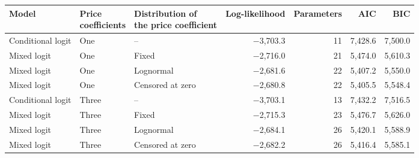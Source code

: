 \begin{tabular}{lllrrrr}
\toprule
Model & \makecell{Price\\coefficients} & \makecell{Distribution of\\the price coefficient} & Log-likelihood & Parameters & AIC & BIC
\\
\midrule
Conditional logit & One & -- & $-$3,703.3 & 11 & 7,428.6 & 7,500.0 \\
Mixed logit & One & Fixed & $-$2,716.0 & 21 & 5,474.0 & 5,610.3 \\
Mixed logit & One & Lognormal & $-$2,681.6 & 22 & 5,407.2 & 5,550.0 \\
Mixed logit & One & Censored at zero & $-$2,680.8 & 22 & 5,405.5 & 5,548.4 \\ \midrule %
Conditional logit & Three & -- & $-$3,703.1 & 13 & 7,432.2 & 7,516.5 \\
Mixed logit & Three & Fixed & $-$2,715.3 & 23 & 5,476.7 & 5,626.0 \\
Mixed logit & Three & Lognormal & $-$2,684.1 & 26 & 5,420.1 & 5,588.9 \\
Mixed logit & Three & Censored at zero & $-$2,682.2 & 26 & 5,416.4 & 5,585.1 \\
\bottomrule
\end{tabular}
